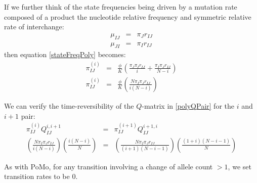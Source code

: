 \documentclass{llncs}
\newcommand{\polyProb}{\ensuremath{\phi}}
\newcommand{\Knorm}{\ensuremath{K}}
\newcommand{\pomo}{PoMo\xspace}
\begin{document}
If we further think of the state frequencies being driven by a mutation rate composed of a product
    the nucleotide relative frequency and symmetric relative rate of interchange:
\begin{eqnarray}
 \mu_{IJ} & = &\pi_J r_{IJ} \\
 \mu_{JI} & = &\pi_I r_{IJ} 
\end{eqnarray}
then equation \ref{stateFreqPoly} becomes:
\begin{eqnarray}
\pi_{IJ}^{(i)} & = & \frac{\polyProb}{\Knorm }\left( \frac{\pi_J\pi_I r_{IJ}}{i} + \frac{\pi_I\pi_J r_{IJ}}{N-i}\right) \nonumber\\
     \pi_{IJ}^{(i)} & = & \frac{\polyProb}{\Knorm }\left( \frac{N\pi_I\pi_J r_{IJ}}{i(N-i)}\right) \label{polyStateFreqSimplified}
\end{eqnarray}

We can verify the time-reversibility of the $Q$-matrix in \ref{polyQPair} for the $i$ and $i+1$ pair:
\begin{eqnarray}
    \pi_{IJ}^{(i)} Q_{IJ}^{i,i+1} & = & \pi_{IJ}^{(i+1)} Q_{IJ}^{i+1,i} \nonumber \\
    \left( \frac{N\pi_I\pi_J r_{IJ}}{i(N-i)}\right) \left(\frac{i(N-i)}{N}\right) & = & \left( \frac{N\pi_I\pi_J r_{IJ}}{(i+1)(N-i-1)}\right)\left(\frac{(1+i)(N-i-1)}{N}\right) \nonumber
\end{eqnarray}

As with \pomo, for any transition involving a change of allele count $>1$, we set transition rates to be 0.
\end{document}
